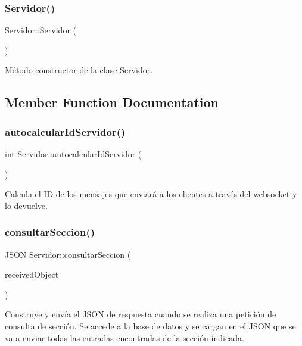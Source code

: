\subsubsection{\texorpdfstring{Servidor()}{Servidor()}}
{\footnotesize\ttfamily Servidor\+::\+Servidor (\begin{DoxyParamCaption}{ }\end{DoxyParamCaption})}

Método constructor de la clase \mbox{\hyperlink{classServidor}{Servidor}}. 

\subsection{Member Function Documentation}
\mbox{\label{classServidor_a292f87f595ed2afd654abe3cc5ba8dc0}} 
\subsubsection{\texorpdfstring{autocalcular\+Id\+Servidor()}{autocalcularIdServidor()}}
{\footnotesize\ttfamily int Servidor\+::autocalcular\+Id\+Servidor (\begin{DoxyParamCaption}{ }\end{DoxyParamCaption})}

Calcula el ID de los mensajes que enviará a los clientes a través del websocket y lo devuelve. \mbox{\label{classServidor_a172605658340719264d589037d2417d8}} 
\subsubsection{\texorpdfstring{consultar\+Seccion()}{consultarSeccion()}}
{\footnotesize\ttfamily J\+S\+ON Servidor\+::consultar\+Seccion (\begin{DoxyParamCaption}\item[{J\+S\+ON}]{received\+Object }\end{DoxyParamCaption})}

Construye y envía el J\+S\+ON de respuesta cuando se realiza una petición de consulta de sección. Se accede a la base de datos y se cargan en el J\+S\+ON que se va a enviar todas las entradas encontradas de la sección indicada. \mbox{\label{classServidor_a211b7b43cd2b5d81b1f21413bce9fbf2}} 
